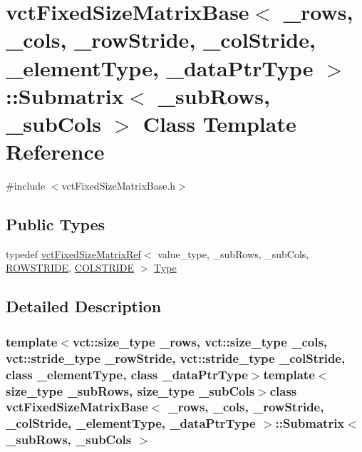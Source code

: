 \hypertarget{classvct_fixed_size_matrix_base_1_1_submatrix}{}\section{vct\+Fixed\+Size\+Matrix\+Base$<$ \+\_\+rows, \+\_\+cols, \+\_\+row\+Stride, \+\_\+col\+Stride, \+\_\+element\+Type, \+\_\+data\+Ptr\+Type $>$\+:\+:Submatrix$<$ \+\_\+sub\+Rows, \+\_\+sub\+Cols $>$ Class Template Reference}
\label{classvct_fixed_size_matrix_base_1_1_submatrix}


{\ttfamily \#include $<$vct\+Fixed\+Size\+Matrix\+Base.\+h$>$}

\subsection*{Public Types}
\begin{DoxyCompactItemize}
\item 
typedef \hyperlink{classvct_fixed_size_matrix_ref}{vct\+Fixed\+Size\+Matrix\+Ref}$<$ value\+\_\+type, \+\_\+sub\+Rows, \+\_\+sub\+Cols, \hyperlink{classvct_fixed_size_matrix_base_a7ca4cc289d4bd697476f2d37e82e9a38a6c561939f5de9c5e815b889df7662117}{R\+O\+W\+S\+T\+R\+I\+D\+E}, \hyperlink{classvct_fixed_size_matrix_base_a7ca4cc289d4bd697476f2d37e82e9a38a920a67cbcd917bab0e46677bf43cb6b8}{C\+O\+L\+S\+T\+R\+I\+D\+E} $>$ \hyperlink{classvct_fixed_size_matrix_base_1_1_submatrix_a0159859a38f45bd4a73c8202e573b6bd}{Type}
\end{DoxyCompactItemize}


\subsection{Detailed Description}
\subsubsection*{template$<$vct\+::size\+\_\+type \+\_\+rows, vct\+::size\+\_\+type \+\_\+cols, vct\+::stride\+\_\+type \+\_\+row\+Stride, vct\+::stride\+\_\+type \+\_\+col\+Stride, class \+\_\+element\+Type, class \+\_\+data\+Ptr\+Type$>$template$<$size\+\_\+type \+\_\+sub\+Rows, size\+\_\+type \+\_\+sub\+Cols$>$class vct\+Fixed\+Size\+Matrix\+Base$<$ \+\_\+rows, \+\_\+cols, \+\_\+row\+Stride, \+\_\+col\+Stride, \+\_\+element\+Type, \+\_\+data\+Ptr\+Type $>$\+::\+Submatrix$<$ \+\_\+sub\+Rows, \+\_\+sub\+Cols $>$}


